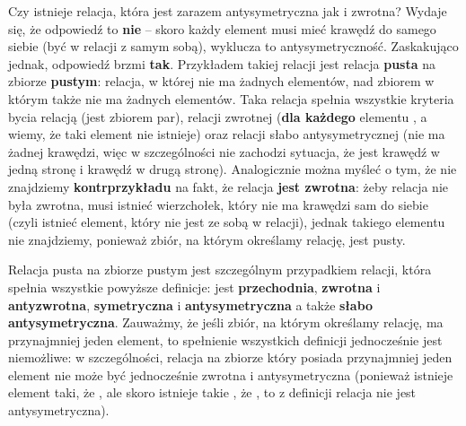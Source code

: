 Czy istnieje relacja, która jest zarazem antysymetryczna jak i zwrotna? Wydaje się, że odpowiedź to \textbf{nie} -- skoro każdy element musi mieć krawędź do samego siebie (być w relacji z samym sobą), wyklucza to antysymetryczność. Zaskakująco jednak, odpowiedź brzmi \textbf{tak}. Przykładem takiej relacji jest relacja \textbf{pusta} na zbiorze \textbf{pustym}: relacja, w której nie ma żadnych elementów, nad zbiorem w którym także nie ma żadnych elementów. Taka relacja spełnia wszystkie kryteria bycia relacją (jest zbiorem par), relacji zwrotnej (\textbf{dla każdego} elementu , a wiemy, że taki element nie istnieje) oraz relacji słabo antysymetrycznej (nie ma żadnej krawędzi, więc w szczególności nie zachodzi sytuacja, że jest krawędź w jedną stronę i krawędź w drugą stronę). Analogicznie można myśleć o tym, że nie znajdziemy \textbf{kontrprzykładu} na fakt, że relacja \textbf{jest zwrotna}: żeby relacja nie była zwrotna, musi istnieć wierzchołek, który nie ma krawędzi sam do siebie (czyli istnieć element, który nie jest ze sobą w relacji), jednak takiego elementu nie znajdziemy, ponieważ zbiór, na którym określamy relację, jest pusty.

Relacja pusta na zbiorze pustym jest szczególnym przypadkiem relacji, która spełnia wszystkie powyższe definicje: jest \textbf{przechodnia}, \textbf{zwrotna} i \textbf{antyzwrotna}, \textbf{symetryczna} i \textbf{antysymetryczna} a także \textbf{słabo antysymetryczna}. Zauważmy, że jeśli zbiór, na którym określamy relację, ma przynajmniej jeden element, to spełnienie wszystkich definicji jednocześnie jest niemożliwe: w szczególności, relacja na zbiorze który posiada przynajmniej jeden element nie może być jednocześnie zwrotna i antysymetryczna (ponieważ istnieje element  taki, że , ale skoro istnieje takie , że , to z definicji relacja nie jest antysymetryczna). 

